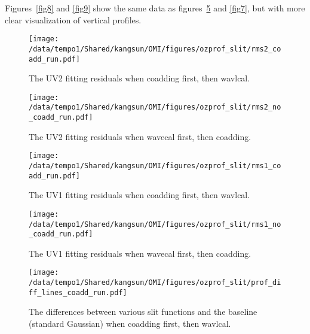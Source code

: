 \documentclass[hidelinks,12pt]{article}
\begin{document}
Figures~\ref{fig8} and \ref{fig9} show the same data as figures~\ref{fig6} and \ref{fig7}, but with more clear visualization of vertical profiles.

\begin{figure}[hbtp]
  \begin{center}
    \texttt{[image: /data/tempo1/Shared/kangsun/OMI/figures/ozprof\_slit/rms2\_coadd\_run.pdf]}
  \caption{The UV2 fitting residuals when coadding first, then wavlcal.}
    \label{fig2}
  \end{center}
\end{figure}


\begin{figure}[hbtp]
  \begin{center}
    \texttt{[image: /data/tempo1/Shared/kangsun/OMI/figures/ozprof\_slit/rms2\_no\_coadd\_run.pdf]}
  \caption{The UV2 fitting residuals when wavecal first, then coadding.}
    \label{fig3}
  \end{center}
\end{figure}


\begin{figure}[hbtp]
  \begin{center}
    \texttt{[image: /data/tempo1/Shared/kangsun/OMI/figures/ozprof\_slit/rms1\_coadd\_run.pdf]}
  \caption{The UV1 fitting residuals when coadding first, then wavlcal.}
    \label{fig4}
  \end{center}
\end{figure}


\begin{figure}[hbtp]
  \begin{center}
    \texttt{[image: /data/tempo1/Shared/kangsun/OMI/figures/ozprof\_slit/rms1\_no\_coadd\_run.pdf]}
  \caption{The UV1 fitting residuals when wavecal first, then coadding.}
    \label{fig5}
  \end{center}
\end{figure}


\begin{figure}[hbtp]
  \begin{center}
    \texttt{[image: /data/tempo1/Shared/kangsun/OMI/figures/ozprof\_slit/prof\_diff\_lines\_coadd\_run.pdf]}
  \caption{The differences between various slit functions and the baseline (standard Gaussian) when coadding first, then wavlcal.}
    \label{fig6}
  \end{center}
\end{figure}
\end{document}
